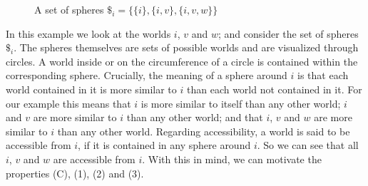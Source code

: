 \documentclass[a4paper,american]{paper}
\theoremstyle{definition}\newtheorem{definition}{Definition}
\begin{document}
\begin{figure}[H]
\centering
{}
\caption{A set of spheres $\$_i=\{\{ i\} ,\{ i,v\} ,\{ i,v,w\}\}$}
\label{fig:set_of_spheres}
\end{figure}

\noindent In this example we look at the worlds $i$, $v$ and $w$; and consider the set of spheres $\$_i$. The spheres themselves are sets of possible worlds and are visualized through circles. A world inside or on the circumference of a circle is contained within the corresponding sphere. Crucially, the meaning of a sphere around $i$ is that each world contained in it is more similar to $i$ than each world not contained in it. For our example this means that $i$ is more similar to itself than any other world; $i$ and $v$ are more similar to $i$ than any other world; and that $i$, $v$ and $w$ are more similar to $i$ than any other world. Regarding accessibility, a world is said to be accessible from $i$, if it is contained in any sphere around $i$. So we can see that all $i$, $v$ and $w$ are accessible from $i$. With this in mind, we can motivate the properties (C), (1), (2) and (3).\\
\end{document}
